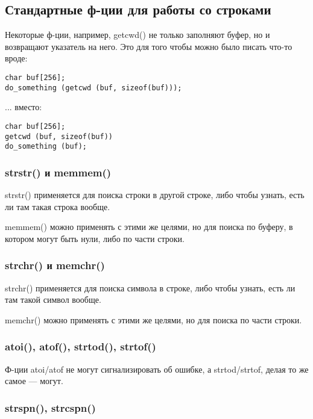 ﻿\subsection{Стандартные ф-ции для работы со строками}

Некоторые ф-ции, например, getcwd() не только заполняют буфер, но и возвращают указатель на него.
Это для того чтобы можно было писать что-то вроде:

\begin{lstlisting}
char buf[256];
do_something (getcwd (buf, sizeof(buf)));
\end{lstlisting}

... вместо:

\begin{lstlisting}
char buf[256];
getcwd (buf, sizeof(buf))
do_something (buf);
\end{lstlisting}

\subsubsection{strstr() и memmem()}

strstr() применяется для поиска строки в другой строке, либо чтобы узнать, есть ли там такая строка вообще.

memmem() можно применять с этими же целями, но для поиска по буферу, в котором могут быть нули,
либо по части строки.

\label{memchr}
\subsubsection{strchr() и memchr()}

strchr() применяется для поиска символа в строке, либо чтобы узнать, есть ли там такой символ вообще.

memchr() можно применять с этими же целями, но для поиска по части строки.

\subsubsection{atoi(), atof(), strtod(), strtof()}

Ф-ции atoi/atof не могут сигнализировать об ошибке, а strtod/strtof, делая то же самое --- могут.



\subsubsection{strspn(), strcspn()}

